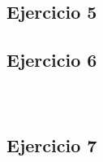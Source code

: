 \documentclass[10pt,a4paper]{article}
\begin{document}
\subsubsection{}
    \begin{lstlisting}
    \end{lstlisting}
\subsection{Ejercicio 5}
\subsection{Ejercicio 6}
\subsubsection{}
    \begin{lstlisting}
    \end{lstlisting}
\subsubsection{}
    \begin{lstlisting}
    \end{lstlisting}
\subsection{Ejercicio 7}
\subsubsection{}
    \begin{lstlisting}
    \end{lstlisting}
\subsubsection{}
    \begin{lstlisting}
    \end{lstlisting}
\subsubsection{}
    \begin{lstlisting}
    \end{lstlisting}
\subsubsection{}
    \begin{lstlisting}
    \end{lstlisting}
\end{document}
